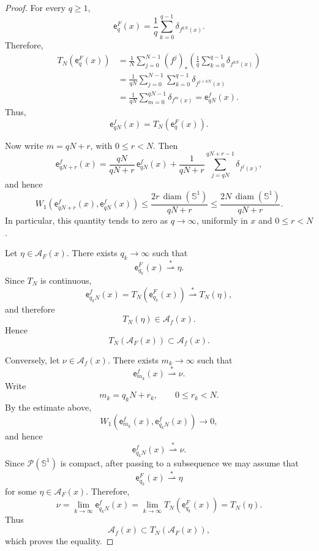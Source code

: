 \documentclass[10pt,a4paper]{amsart}
\newcommand{\Sone}{\mathbb{S}^1}
\newcommand{\Wone}{W_1}
\newcommand{\cA}{{\mathcal A}}
\newcommand{\cP}{{\mathcal P}}
\newcommand{\diam}{\operatorname{diam}}
\newcommand{\emp}{\mathsf e}
\newcommand{\wto}{\overset{*}{\rightharpoonup}}
\begin{document}
\begin{proof}
For every \(q\ge1\),
\[
\emp_q^F(x)
=
\frac1q\sum_{k=0}^{q-1}\delta_{f^{kN}(x)}.
\]
Therefore,
\[
\begin{aligned}
T_N(\emp_q^F(x))
&=
\frac1N\sum_{j=0}^{N-1}
(f^j)_*
\left(
\frac1q\sum_{k=0}^{q-1}\delta_{f^{kN}(x)}
\right)
\\
&=
\frac1{qN}
\sum_{j=0}^{N-1}\sum_{k=0}^{q-1}
\delta_{f^{j+kN}(x)}
\\
&=
\frac1{qN}\sum_{m=0}^{qN-1}\delta_{f^m(x)}
=
\emp_{qN}^f(x).
\end{aligned}
\]
Thus,
\[
\emp_{qN}^f(x)=T_N(\emp_q^F(x)).
\]

Now write \(m=qN+r\), with \(0\le r<N\). Then
\[
\emp_{qN+r}^f(x)
=
\frac{qN}{qN+r}\,\emp_{qN}^f(x)
+
\frac1{qN+r}
\sum_{j=qN}^{qN+r-1}\delta_{f^j(x)},
\]
and hence
\[
\Wone(\emp_{qN+r}^f(x),\emp_{qN}^f(x))
\le
\frac{2r\,\diam(\Sone)}{qN+r}
\le
\frac{2N\,\diam(\Sone)}{qN+r}.
\]
In particular, this quantity tends to zero as \(q\to\infty\), uniformly
in \(x\) and \(0\le r<N\).

Let \(\eta\in\cA_F(x)\). There exists \(q_k\to\infty\) such that
\[
\emp_{q_k}^F(x)\wto\eta.
\]
Since \(T_N\) is continuous,
\[
\emp_{q_kN}^f(x)
=
T_N(\emp_{q_k}^F(x))
\wto T_N(\eta),
\]
and therefore
\[
T_N(\eta)\in\cA_f(x).
\]
Hence
\[
T_N(\cA_F(x))\subset\cA_f(x).
\]

Conversely, let \(\nu\in\cA_f(x)\). There exists \(m_k\to\infty\) such that
\[
\emp_{m_k}^f(x)\wto\nu.
\]
Write
\[
m_k=q_kN+r_k,
\qquad
0\le r_k<N.
\]
By the estimate above,
\[
\Wone(\emp_{m_k}^f(x),\emp_{q_kN}^f(x))\to0,
\]
and hence
\[
\emp_{q_kN}^f(x)\wto\nu.
\]
Since \(\cP(\Sone)\) is compact, after passing to a subsequence we may
assume that
\[
\emp_{q_k}^F(x)\wto\eta
\]
for some \(\eta\in\cA_F(x)\). Therefore,
\[
\nu
=
\lim_{k\to\infty}\emp_{q_kN}^f(x)
=
\lim_{k\to\infty}T_N(\emp_{q_k}^F(x))
=
T_N(\eta).
\]
Thus
\[
\cA_f(x)\subset T_N(\cA_F(x)),
\]
which proves the equality.
\end{proof}
\end{document}
